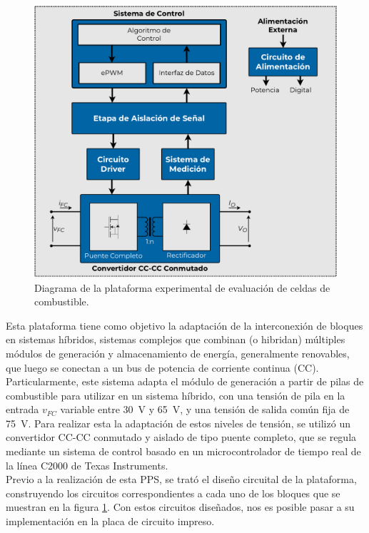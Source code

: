 \begin{figure}[h]
    \centering
    \includegraphics[scale=0.4]{Imagenes/Plataforma Detallada.pdf}
    \caption{Diagrama de la plataforma experimental de evaluación de celdas de combustible.}
    \label{fig:plataforma}
\end{figure}

Esta plataforma tiene como objetivo la adaptación de la interconexión de bloques en sistemas híbridos, sistemas complejos que combinan (o hibridan) múltiples módulos de generación y almacenamiento de energía, generalmente renovables, que luego se conectan a un bus de potencia de corriente continua (CC).\\

Particularmente, este sistema adapta el módulo de generación a partir de pilas de combustible para utilizar en un sistema híbrido, con una tensión de pila en la entrada $v_{FC}$ variable entre \SI[]{30}[]{\volt} y \SI[]{65}[]{\volt}, y una tensión de salida común fija de \SI[]{75}[]{\volt}. Para realizar esta la adaptación de estos niveles de tensión, se utilizó un convertidor CC-CC conmutado y aislado de tipo puente completo, que se regula mediante un sistema de control basado en un microcontrolador de tiempo real de la línea C2000 de Texas Instruments.\\

Previo a la realización de esta PPS, se trató el diseño circuital de la plataforma, construyendo los circuitos correspondientes a cada uno de los bloques que se muestran en la figura \ref{fig:plataforma}. Con estos circuitos diseñados, nos es posible pasar a su implementación en la placa de circuito impreso.\\